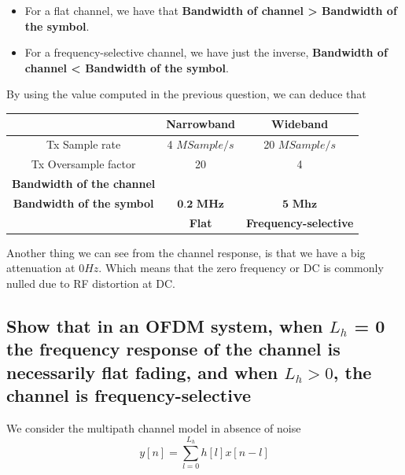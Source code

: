 \documentclass[frenchb, oneside, headings=normal]{scrartcl}
\begin{document}
\begin{itemize}
\item For a flat channel, we have that \textbf{Bandwidth of channel > Bandwidth of the symbol}.
\item For a frequency-selective channel, we have just the inverse, \textbf{Bandwidth of channel < Bandwidth of the symbol}. 

\end{itemize}

By using the value computed in the previous question, we can deduce that

\begin{center}
	\begin{tabular}{c|c|c}
		  & Narrowband & Wideband\\
		  \hline
	Tx Sample rate & 4 $MSample/s$ & 20 $MSample/s$ \\	  
	Tx Oversample factor & 20 & 4\\
	\hline
	\textbf{Bandwidth of the channel} &   & \\
    \textbf{Bandwidth of the symbol} & $\textbf{0.2~MHz}$ & $\textbf{5~Mhz}$\\
        \hline
                                     & \color{red} \textbf{Flat}  & \color{red} \textbf{Frequency-selective}\\                               
	\end{tabular}
	\label{tab1}
\end{center}

Another thing we can see from the channel response, is that we have a big attenuation at $0 Hz$. Which means that the zero frequency or DC is commonly nulled due to RF distortion at DC. 

\subsection{Show that in an OFDM system, when $L_h$ = 0 the frequency response of the channel is necessarily flat fading, and when $L_h > 0$, the channel is frequency-selective}

We consider the multipath channel model in absence of noise 
\begin{equation}
y[n]=\sum_{l=0}^{L_h} h[l]x[n-l] 
\end{equation}
\end{document}
